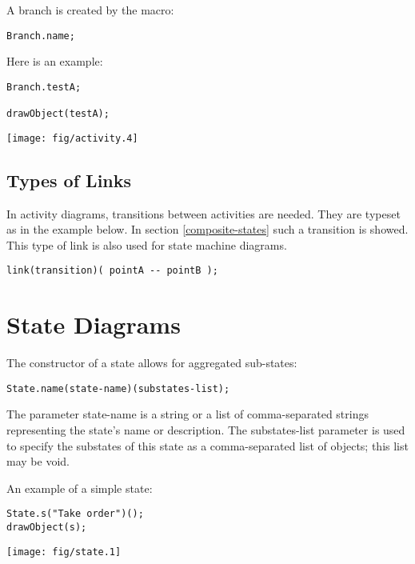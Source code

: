 \documentclass{article}
\newcommand{\code}{\ttfamily}
\begin{document}
A branch is created by the macro:

\begin{verbatim}
Branch.name;
\end{verbatim}

Here is an example:

\begin{multicols}{2}
\begin{verbatim}
Branch.testA;

drawObject(testA);
\end{verbatim}
\columnbreak
\hspace{1cm}\texttt{[image: fig/activity.4]}
\end{multicols}


\subsection{Types of Links}

In activity diagrams, transitions between activities are needed. They are typeset
as in the example below. In section \ref{composite-states} such a transition
is showed. This type of link is also used for state machine diagrams.

\begin{verbatim}
link(transition)( pointA -- pointB );
\end{verbatim}

\section{State Diagrams}

The constructor of a state allows for aggregated sub-states:

\begin{verbatim}
State.name(state-name)(substates-list);
\end{verbatim}

The parameter {\code state-name} is a string or a list of comma-separated strings representing
the state's name or description. The {\code substates-list} parameter is used to specify
the substates of this state as a comma-separated list of objects; this list may be void.

An example of a simple state:

\begin{multicols}{2}
\begin{verbatim}
State.s("Take order")();
drawObject(s);
\end{verbatim}
\columnbreak
\hspace{1cm}\texttt{[image: fig/state.1]}
\end{multicols}
\end{document}
